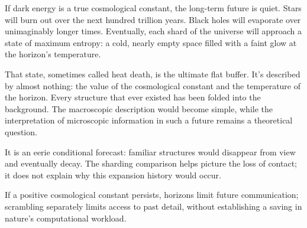 If dark energy is a true cosmological constant, the long-term future is quiet. Stars will burn out over the next hundred trillion years. Black holes will evaporate over unimaginably longer times. Eventually, each shard of the universe will approach a state of maximum entropy: a cold, nearly empty space filled with a faint glow at the horizon's temperature.

That state, sometimes called heat death, is the ultimate flat buffer. It's described by almost nothing: the value of the cosmological constant and the temperature of the horizon. Every structure that ever existed has been folded into the background. The macroscopic description would become simple, while the interpretation of microscopic information in such a future remains a theoretical question.

It is an eerie conditional forecast: familiar structures would disappear from view and eventually decay. The sharding comparison helps picture the loss of contact; it does not explain why this expansion history would occur.

\begin{keytakeawaybox}
If a positive cosmological constant persists, horizons limit future communication; scrambling separately limits access to past detail, without establishing a saving in nature's computational workload.
\end{keytakeawaybox}
